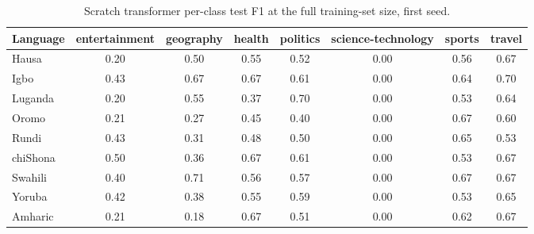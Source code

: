\begin{table}[t]
\centering
\caption{Scratch transformer per-class test F1 at the full training-set size, first seed.}
\label{tab:scratch_per_class_f1_full}
\small
\begin{tabular}{lccccccc}
\toprule
Language & entertainment & geography & health & politics & science-technology & sports & travel \\
\midrule
Hausa & 0.20 & 0.50 & 0.55 & 0.52 & 0.00 & 0.56 & 0.67 \\
Igbo & 0.43 & 0.67 & 0.67 & 0.61 & 0.00 & 0.64 & 0.70 \\
Luganda & 0.20 & 0.55 & 0.37 & 0.70 & 0.00 & 0.53 & 0.64 \\
Oromo & 0.21 & 0.27 & 0.45 & 0.40 & 0.00 & 0.67 & 0.60 \\
Rundi & 0.43 & 0.31 & 0.48 & 0.50 & 0.00 & 0.65 & 0.53 \\
chiShona & 0.50 & 0.36 & 0.67 & 0.61 & 0.00 & 0.53 & 0.67 \\
Swahili & 0.40 & 0.71 & 0.56 & 0.57 & 0.00 & 0.67 & 0.67 \\
Yoruba & 0.42 & 0.38 & 0.55 & 0.59 & 0.00 & 0.53 & 0.65 \\
Amharic & 0.21 & 0.18 & 0.67 & 0.51 & 0.00 & 0.62 & 0.67 \\
\bottomrule
\end{tabular}
\end{table}